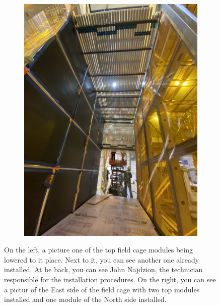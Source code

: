 \begin{figure}[ht!]
\begin{subfigure}[t]{0.48\textwidth}
        \includegraphics[width=\textwidth]{Figures/field_cage_2.jpeg}
        \caption{}
    \end{subfigure}
	\caption{On the left, a picture one of the top field cage modules being lowered to it place. Next to it, you can see another one already installed. At be back, you can see John Najdzion, the technician responsible for the installation procedures. On the right, you can see a pictur of the East side of the field cage with two top modules installed and one module of the North side installed.}
    \label{field_cage}
\end{figure}
